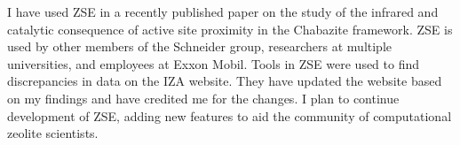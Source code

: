 \documentclass[11pt]{article}
\begin{document}
I have used ZSE in a recently published paper on the study of the infrared and catalytic consequence of active site proximity in the Chabazite framework. \cite{kester-2021-effec-broen} ZSE is used by other members of the Schneider group, researchers at multiple universities, and employees at Exxon Mobil. Tools in ZSE were used to find discrepancies in data on the IZA website. They have updated the website based on my findings and have credited me for the changes. I plan to continue development of ZSE, adding new features to aid the community of computational zeolite scientists. 



\end{document}
